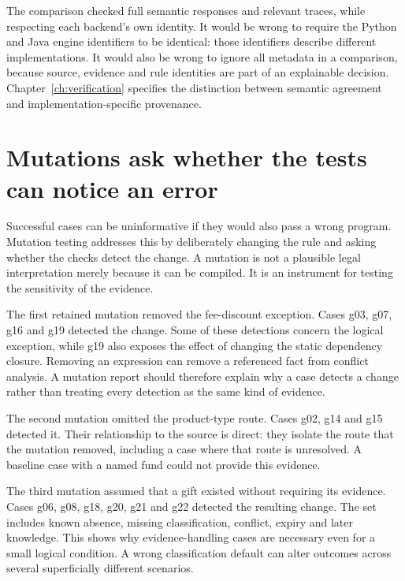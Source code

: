 The comparison checked full semantic responses and relevant traces, while
respecting each backend's own identity. It would be wrong to require the Python
and Java engine identifiers to be identical: those identifiers describe
different implementations. It would also be wrong to ignore all metadata in a
comparison, because source, evidence and rule identities are part of an
explainable decision. Chapter~\ref{ch:verification} specifies the distinction
between semantic agreement and implementation-specific provenance.

\section{Mutations ask whether the tests can notice an error}
\label{merge:M02:05}

\label{sec:circular-mutations}
Successful cases can be uninformative if they would also pass a wrong program.
Mutation testing addresses this by deliberately changing the rule and asking
whether the checks detect the change. A mutation is not a plausible legal
interpretation merely because it can be compiled. It is an instrument for
testing the sensitivity of the evidence.

The first retained mutation removed the fee-discount exception. Cases g03, g07,
g16 and g19 detected the change. Some of these detections concern the logical
exception, while g19 also exposes the effect of changing the static dependency
closure. Removing an expression can remove a referenced fact from conflict
analysis. A mutation report should therefore explain why a case detects a
change rather than treating every detection as the same kind of evidence.

The second mutation omitted the product-type route. Cases g02, g14 and g15
detected it. Their relationship to the source is direct: they isolate the
route that the mutation removed, including a case where that route is
unresolved. A baseline case with a named fund could not provide this evidence.


The third mutation assumed that a gift existed without requiring its evidence.
Cases g06, g08, g18, g20, g21 and g22 detected the resulting change. The set
includes known absence, missing classification, conflict, expiry and later
knowledge. This shows why evidence-handling cases are necessary even for a
small logical condition. A wrong classification default can alter outcomes
across several superficially different scenarios.


